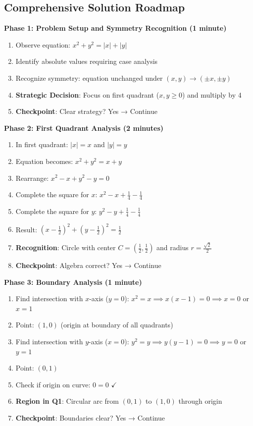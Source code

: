 \documentclass[]{article}
\begin{document}
\begin{solutionbox}
\subsection*{Comprehensive Solution Roadmap}

\textbf{Phase 1: Problem Setup and Symmetry Recognition (1 minute)}
\begin{enumerate}[leftmargin=*]
    \item Observe equation: $x^2 + y^2 = |x| + |y|$
    \item Identify absolute values requiring case analysis
    \item Recognize symmetry: equation unchanged under $(x,y) \to (\pm x, \pm y)$
    \item \textbf{Strategic Decision}: Focus on first quadrant ($x,y \geq 0$) and multiply by 4
    \item \textbf{Checkpoint}: Clear strategy? Yes → Continue
\end{enumerate}

\textbf{Phase 2: First Quadrant Analysis (2 minutes)}
\begin{enumerate}[leftmargin=*]
    \item In first quadrant: $|x| = x$ and $|y| = y$
    \item Equation becomes: $x^2 + y^2 = x + y$
    \item Rearrange: $x^2 - x + y^2 - y = 0$
    \item Complete the square for $x$: $x^2 - x + \frac{1}{4} - \frac{1}{4}$
    \item Complete the square for $y$: $y^2 - y + \frac{1}{4} - \frac{1}{4}$
    \item Result: $(x - \frac{1}{2})^2 + (y - \frac{1}{2})^2 = \frac{1}{2}$
    \item \textbf{Recognition}: Circle with center $C = (\frac{1}{2}, \frac{1}{2})$ and radius $r = \frac{\sqrt{2}}{2}$
    \item \textbf{Checkpoint}: Algebra correct? Yes → Continue
\end{enumerate}

\textbf{Phase 3: Boundary Analysis (1 minute)}
\begin{enumerate}[leftmargin=*]
    \item Find intersection with $x$-axis ($y=0$): $x^2 = x \implies x(x-1) = 0 \implies x = 0$ or $x = 1$
    \item Point: $(1, 0)$ (origin at boundary of all quadrants)
    \item Find intersection with $y$-axis ($x=0$): $y^2 = y \implies y(y-1) = 0 \implies y = 0$ or $y = 1$
    \item Point: $(0, 1)$
    \item Check if origin on curve: $0 = 0$ $\checkmark$
    \item \textbf{Region in Q1}: Circular arc from $(0,1)$ to $(1,0)$ through origin
    \item \textbf{Checkpoint}: Boundaries clear? Yes → Continue
\end{enumerate}


\end{solutionbox}
\end{document}
